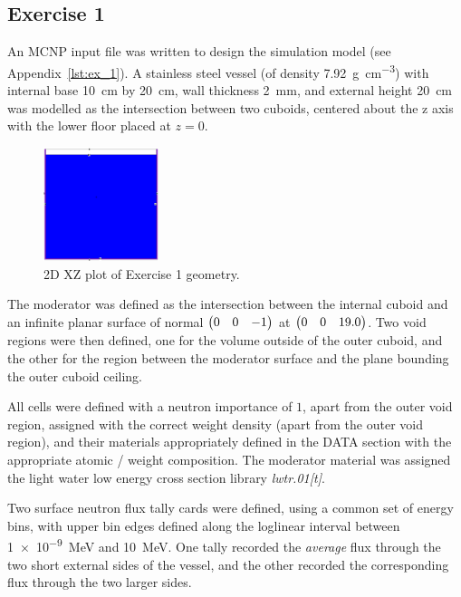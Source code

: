 \documentclass{article}
\begin{document}
  \subsection{Exercise 1}
    \label{sec:ex_1}
    An MCNP input file was written to design the simulation model (see Appendix~\ref{lst:ex_1}). A stainless steel vessel (of  density \SI{7.92}{\gram\per\cm^3}) with internal base \SI{10}{\cm} by \SI{20}{\cm}, wall thickness \SI{2}{\mm}, and external height \SI{20}{\cm} was modelled as the intersection between two cuboids, centered about the z axis with the lower floor placed at $z=0$.
    \begin{figure}[htb]
      \centering
      \includegraphics[width=0.3\textwidth]{cuboid.png}
      \caption{2D XZ plot of Exercise 1 geometry.}
      \label{fig:ex_1_geometry}
    \end{figure}
    The moderator was defined as the intersection between the internal cuboid and an infinite planar surface of normal $\mqty(0 & 0 & -1)$ at $\mqty(0 & 0 & 19.0)$. Two void regions were then defined, one for the volume outside of the outer cuboid, and the other for the region between the moderator surface and the plane bounding the outer cuboid ceiling.

    All cells were defined with a neutron importance of $1$, apart from the outer void region, assigned with the correct weight density (apart from the outer void region), and their materials appropriately defined in the DATA section with the appropriate atomic / weight composition. The moderator material was assigned the light water low energy cross section library \textit{lwtr.01[t]}.

    Two surface neutron flux tally cards were defined, using a common set of energy bins, with upper bin edges defined along the log\textendash linear interval between \SI{1e-9}{\MeV} and \SI{10}{\MeV}. One tally recorded the \textit{average} flux through the two short external sides of the vessel, and the other recorded the corresponding flux through the two larger sides.
\end{document}
